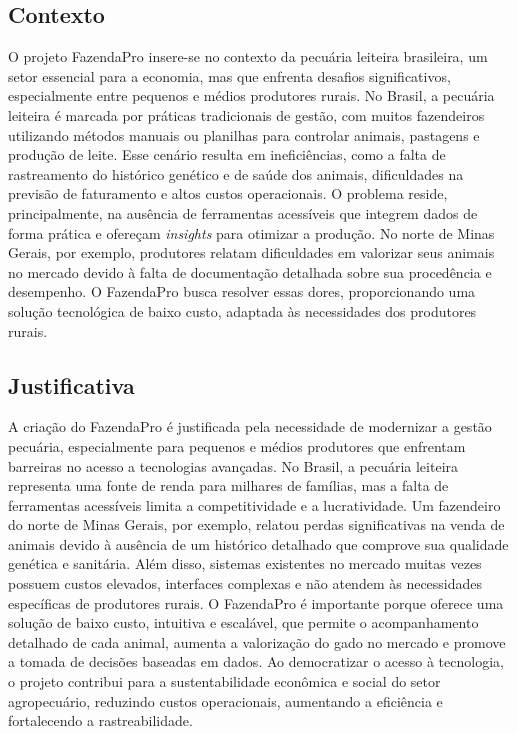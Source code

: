 \documentclass[12pt, a4paper]{article}
\begin{document}
\subsection{Contexto}
\begin{spacing}{1.5}
O projeto FazendaPro insere-se no contexto da pecuária leiteira brasileira, um setor essencial para a economia, mas que enfrenta desafios significativos, especialmente entre pequenos e médios produtores rurais. No Brasil, a pecuária leiteira é marcada por práticas tradicionais de gestão, com muitos fazendeiros utilizando métodos manuais ou planilhas para controlar animais, pastagens e produção de leite. Esse cenário resulta em ineficiências, como a falta de rastreamento do histórico genético e de saúde dos animais, dificuldades na previsão de faturamento e altos custos operacionais. O problema reside, principalmente, na ausência de ferramentas acessíveis que integrem dados de forma prática e ofereçam \textit{insights} para otimizar a produção. No norte de Minas Gerais, por exemplo, produtores relatam dificuldades em valorizar seus animais no mercado devido à falta de documentação detalhada sobre sua procedência e desempenho. O FazendaPro busca resolver essas dores, proporcionando uma solução tecnológica de baixo custo, adaptada às necessidades dos produtores rurais.
\end{spacing}

\subsection{Justificativa}
\begin{spacing}{1.5}
A criação do FazendaPro é justificada pela necessidade de modernizar a gestão pecuária, especialmente para pequenos e médios produtores que enfrentam barreiras no acesso a tecnologias avançadas. No Brasil, a pecuária leiteira representa uma fonte de renda para milhares de famílias, mas a falta de ferramentas acessíveis limita a competitividade e a lucratividade. Um fazendeiro do norte de Minas Gerais, por exemplo, relatou perdas significativas na venda de animais devido à ausência de um histórico detalhado que comprove sua qualidade genética e sanitária. Além disso, sistemas existentes no mercado muitas vezes possuem custos elevados, interfaces complexas e não atendem às necessidades específicas de produtores rurais. O FazendaPro é importante porque oferece uma solução de baixo custo, intuitiva e escalável, que permite o acompanhamento detalhado de cada animal, aumenta a valorização do gado no mercado e promove a tomada de decisões baseadas em dados. Ao democratizar o acesso à tecnologia, o projeto contribui para a sustentabilidade econômica e social do setor agropecuário, reduzindo custos operacionais, aumentando a eficiência e fortalecendo a rastreabilidade.
\end{spacing}
\end{document}
